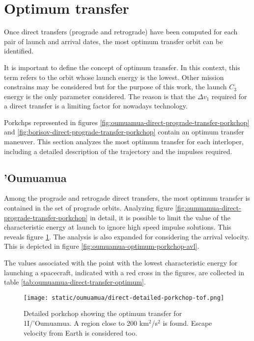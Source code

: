 \section{Optimum transfer}
\label{sec:optimum-transfer}

Once direct transfers (prograde and retrograde) have been computed for each pair
of launch and arrival dates, the most optimum transfer orbit can be identified.

It is important to define the concept of optimum transfer. In this context, this
term refers to the orbit whose launch energy is the lowest. Other mission
constrains may be considered but for the purpose of this work, the launch $C_3$
energy is the only parameter considered. The reason is that the $\Delta v_1$
required for a direct transfer is a limiting factor for nowadays technology.

Porkchps represented in figures
\ref{fig:oumuamua-direct-prograde-transfer-porkchop} and
\ref{fig:borisov-direct-prograde-transfer-porkchop} contain an optimum transfer
maneuver. This section analyzes the most optimum transfer for each interloper,
including a detailed description of the trajectory and the impulses required.

\subsection{'Oumuamua}

Among the prograde and retrogade direct transfers, the most optimum transfer is
contained in the set of prograde orbits. Analyzing figure
\ref{fig:oumuamua-direct-prograde-transfer-porkchop} in detail, it is possible
to limit the value of the characteristic energy at launch to ignore high speed
impulse solutions. This reveals figure \ref{fig:oumuamua-optimum-porkchop}. The
analysis is also expanded for considering the arrival velocity. This is depicted
in figure \ref{fig:oumuamua-optimum-porkchop-avl}.

The values associated with the point with the lowest characteristic energy for
launching a spacecraft, indicated with a red cross in the figures, are collected
in table \ref{tab:oumuamua-direct-transfer-optimum}.

\begin{figure}[H]
  \centering
  \texttt{[image: static/oumuamua/direct-detailed-porkchop-tof.png]}
  \caption[Detailed porkchop showing the optimum transfer for
    1I/'Oumuamua with the time of flight.]{Detailed porkchop showing the optimum transfer for
    1I/'Oumuamua. A region close to 200 km$^2$/s$^2$ is found. Escape
    velocity from Earth is considered too.
  }
  \label{fig:oumuamua-optimum-porkchop}
\end{figure}

